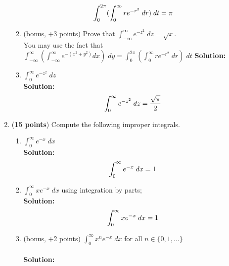\documentclass[a4paper]{article}
\begin{document}
\begin{enumerate}
\begin{enumerate}
\begin{align}
\int_0^{2\pi} (\int_0^\infty re^{-r^2} \; dr)\; dt &= \pi\notag
\end{align}	
	
	
	\item (bonus, +3 points) Prove that $\int_{-\infty}^\infty e^{-z^2} \; dz = \sqrt{x}$.\\You may use the fact that $\int_{-\infty}^\infty(\int_{-\infty}^\infty e^{-(x^2 + y^2)}dx) \; dy = \int_0^{2\pi}(\int_0^\infty re^{-r^2} \; dr)\; dt$
	\textbf{Solution:}\\
	
	\item $\int_0^\infty e^{-z^2} \; dz$\\
	\textbf{Solution:}\\	

\begin{align}
\int_0^\infty e^{-z^2} \; dz &= \frac{\sqrt{\pi}}{2}\notag
\end{align}		
	
\end{enumerate}



\item (\textbf{15 points}) Compute the following improper integrals.


\begin{enumerate}
	\item $\int_0^\infty e^{-x} \; dx$\\
	\textbf{Solution:}\\

\begin{align}
\int_0^\infty e^{-x} \; dx &= 1\notag
\end{align}	
	
	\item $\int_0^\infty xe^{-x} \; dx$ using integration by parts;\\
	\textbf{Solution:}\\	

\begin{align}
\int_0^\infty xe^{-x} \; dx &= 1\notag
\end{align}	
	
	\item (bonus, +2 points) $\int_0^\infty x^ne^{-x} \; dx$ for all $n \in \{ 0,1,... \}$\\ \relax [Hint: Try first for n = 0,1,2,3]\\
	\textbf{Solution:}\\	
	

\end{enumerate}
\end{enumerate}
\end{document}
